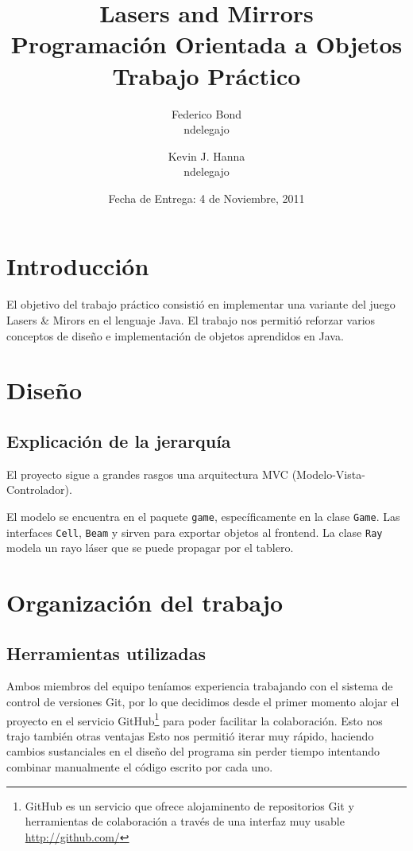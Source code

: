 \documentclass[a4paper, 11pt]{article}
\title{\Huge {Lasers and Mirrors} \\ Programación Orientada a Objetos\\[0.7cm] Trabajo Práctico}
\author{Federico Bond\\ndelegajo \and Kevin J. Hanna\\ndelegajo}
\date{Fecha de Entrega: 4 de Noviembre, 2011}
\begin{document}
 

\maketitle

\newpage
\tableofcontents
\clearpage 

\section{Introducción}
El objetivo del trabajo práctico consistió en implementar una variante del juego Lasers \& Mirors en el lenguaje Java. El trabajo nos permitió reforzar varios conceptos de diseño e implementación de objetos aprendidos en Java.

\section{Diseño}

	\subsection{Explicación de la jerarquía}
	El proyecto sigue a grandes rasgos una arquitectura MVC (Modelo-Vista-Controlador).

	El modelo se encuentra en el paquete \texttt{game}, específicamente en la clase \texttt{Game}. Las interfaces \texttt{Cell}, \texttt{Beam} y  sirven para exportar objetos al frontend. La clase \texttt{Ray} modela un rayo láser que se puede propagar por el tablero.

\section{Organización del trabajo}

	\subsection{Herramientas utilizadas}
	Ambos miembros del equipo teníamos experiencia trabajando con el sistema de control de versiones Git, por lo que decidimos desde el primer momento alojar el proyecto en el servicio GitHub\footnote{GitHub es un servicio que ofrece alojaminento de repositorios Git y herramientas de colaboración a través de una interfaz muy usable \href{http://github.com/}{http://github.com/}} para poder facilitar la colaboración. Esto nos trajo también otras ventajas Esto nos permitió iterar muy rápido, haciendo cambios sustanciales en el diseño del programa sin perder tiempo intentando combinar manualmente el código escrito por cada uno.
\end{document}
